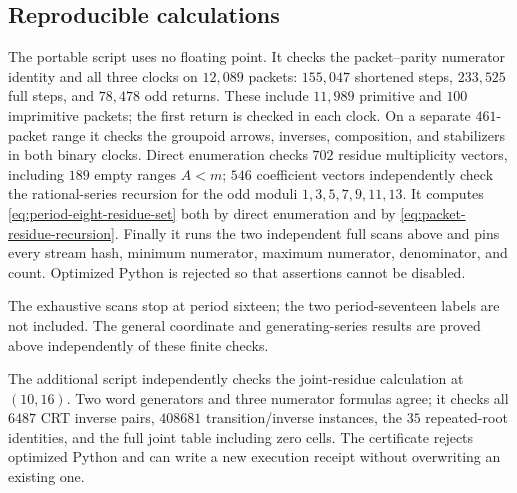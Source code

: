 \subsection{Reproducible calculations}

The portable script
 uses no floating point.
It checks the packet--parity numerator identity and all three clocks on
$12{,}089$ packets: $155{,}047$ shortened steps, $233{,}525$ full steps,
and $78{,}478$ odd returns.  These include $11{,}989$ primitive and $100$
imprimitive packets; the first return is checked in each clock.
On a separate $461$-packet range it checks the groupoid arrows, inverses,
composition, and stabilizers in both binary clocks.  Direct enumeration
checks $702$ residue multiplicity vectors, including $189$ empty ranges
$A<m$; $546$ coefficient vectors independently check the rational-series
recursion for the odd moduli $1,3,5,7,9,11,13$.  It computes
\eqref{eq:period-eight-residue-set} both by direct enumeration and by
\eqref{eq:packet-residue-recursion}.  Finally it runs the two independent
full scans above and pins every stream hash, minimum numerator, maximum
numerator, denominator, and count.  Optimized Python is rejected so that
assertions cannot be disabled.

The exhaustive scans stop at period sixteen; the two period-seventeen
labels are not included.  The general coordinate and generating-series
results are proved above independently of these finite checks.

The additional script 
independently checks the joint-residue calculation at $(10,16)$.  Two word
generators and three numerator formulas agree; it checks all $6487$ CRT
inverse pairs, $408681$ transition/inverse instances, the $35$ repeated-root
identities, and the full joint table including zero cells.  The certificate
rejects optimized Python and can write a new execution receipt without
overwriting an existing one.
